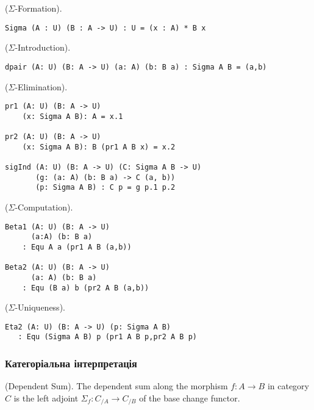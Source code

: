 \begin{definition} ($\Sigma$-Formation).
\begin{lstlisting}
Sigma (A : U) (B : A -> U) : U = (x : A) * B x
\end{lstlisting}
\end{definition}

\begin{definition} ($\Sigma$-Introduction).
\begin{lstlisting}
dpair (A: U) (B: A -> U) (a: A) (b: B a) : Sigma A B = (a,b)
\end{lstlisting}
\end{definition}

\begin{definition} ($\Sigma$-Elimination).
\begin{lstlisting}
pr1 (A: U) (B: A -> U)
    (x: Sigma A B): A = x.1

pr2 (A: U) (B: A -> U)
    (x: Sigma A B): B (pr1 A B x) = x.2

sigInd (A: U) (B: A -> U) (C: Sigma A B -> U)
       (g: (a: A) (b: B a) -> C (a, b))
       (p: Sigma A B) : C p = g p.1 p.2
\end{lstlisting}
\end{definition}

\begin{theorem} ($\Sigma$-Computation).
\begin{lstlisting}
Beta1 (A: U) (B: A -> U)
      (a:A) (b: B a)
    : Equ A a (pr1 A B (a,b))

Beta2 (A: U) (B: A -> U)
      (a: A) (b: B a)
    : Equ (B a) b (pr2 A B (a,b))
\end{lstlisting}
\end{theorem}

\begin{theorem} ($\Sigma$-Uniqueness).
\begin{lstlisting}
Eta2 (A: U) (B: A -> U) (p: Sigma A B)
   : Equ (Sigma A B) p (pr1 A B p,pr2 A B p)
\end{lstlisting}
\end{theorem}

\subsubsection{Категоріальна інтерпретація}

\begin{definition} (Dependent Sum).
The dependent sum along the morphism $f: A \rightarrow B$ in category $C$ is the left
adjoint $\Sigma_f : C_{/A} \rightarrow C_{/B}$ of the base change functor.
\end{definition}

